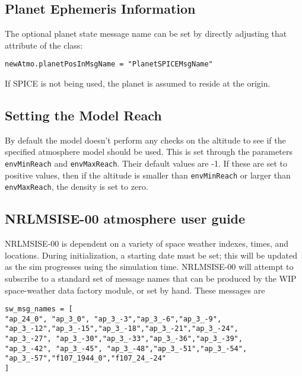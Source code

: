 \subsection{Planet Ephemeris Information}
The optional planet state message name can be set by directly adjusting that attribute of the class:
\begin{verbatim}
newAtmo.planetPosInMsgName = "PlanetSPICEMsgName"
\end{verbatim}
If SPICE is not being used, the planet is assumed to reside at the origin.

\subsection{Setting the Model Reach}
By default the model doesn't perform any checks on the altitude to see if the specified atmosphere model should be used.  This is set through the parameters {\tt envMinReach} and {\tt envMaxReach}.  Their default values are -1.  If these are set to positive values, then if the altitude is smaller than {\tt envMinReach} or larger than {\tt envMaxReach}, the density is set to zero.


\subsection{NRLMSISE-00 atmosphere user guide}
NRLMSISE-00 is dependent on a variety of space weather indexes, times, and locations. During initialization, a starting date must be set; this will be updated as the sim progresses using the simulation time. NRLMSISE-00 will attempt to subscribe to a standard set of message names that can be produced by the WIP space-weather data factory module, or set by hand. These messages are
\begin{verbatim}
sw_msg_names = [
"ap_24_0", "ap_3_0", "ap_3_-3","ap_3_-6","ap_3_-9",
"ap_3_-12","ap_3_-15","ap_3_-18","ap_3_-21","ap_3_-24",
"ap_3_-27", "ap_3_-30","ap_3_-33","ap_3_-36","ap_3_-39",
"ap_3_-42", "ap_3_-45", "ap_3_-48","ap_3_-51","ap_3_-54",
"ap_3_-57","f107_1944_0","f107_24_-24"
]
\end{verbatim}